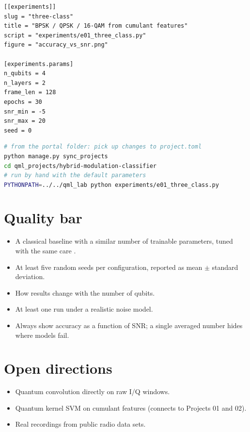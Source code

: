 \documentclass[11pt,a4paper]{article}
\begin{document}
\begin{lstlisting}[language={}]
[[experiments]]
slug = "three-class"
title = "BPSK / QPSK / 16-QAM from cumulant features"
script = "experiments/e01_three_class.py"
figure = "accuracy_vs_snr.png"

[experiments.params]
n_qubits = 4
n_layers = 2
frame_len = 128
epochs = 30
snr_min = -5
snr_max = 20
seed = 0
\end{lstlisting}

\begin{lstlisting}[language=bash]
# from the portal folder: pick up changes to project.toml
python manage.py sync_projects
cd qml_projects/hybrid-modulation-classifier
# run by hand with the default parameters
PYTHONPATH=../../qml_lab python experiments/e01_three_class.py
\end{lstlisting}

\section{Quality bar}
\begin{itemize}
  \item A classical baseline with a similar number of trainable parameters, tuned with the same care \citep{bowles2024}.
  \item At least five random seeds per configuration, reported as mean $\pm$ standard deviation.
  \item How results change with the number of qubits.
  \item At least one run under a realistic noise model.
  \item Always show accuracy as a function of SNR; a single averaged number hides where models fail.
\end{itemize}

\section{Open directions}
\begin{itemize}
  \item Quantum convolution directly on raw I/Q windows.
  \item Quantum kernel SVM on cumulant features (connects to Projects 01 and 02).
  \item Real recordings from public radio data sets.
\end{itemize}
\end{document}
